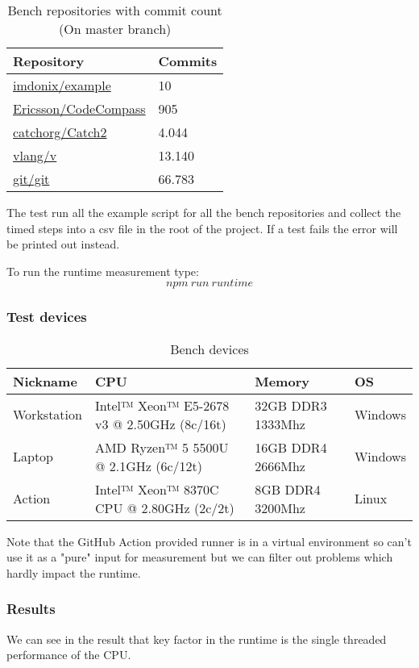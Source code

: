 \begin{table}[H]
	\centering
	\begin{tabular}{ | m{} | m{} | }
		\hline
		\textbf{Repository} & \textbf{Commits} \\
		\hline \hline
		\href{https://github.com/imdonix/example}{imdonix/example} & 10 \\
		\hline
		\href{https://github.com/Ericsson/CodeCompass}{Ericsson/CodeCompass} & 905 \\
		\hline
		\href{https://github.com/catchorg/Catch2}{catchorg/Catch2} & 4.044 \\
		\hline
		\href{https://github.com/vlang/v}{vlang/v} & 13.140 \\
		\hline
		\href{https://github.com/git/git}{git/git} & 66.783 \\
		\hline
	\end{tabular}
	\caption{Bench repositories with commit count (On master branch)}
	\label{tab:runtime}
\end{table}

The test run all the example script for all the bench repositories and collect the timed steps into a csv file in the root of the project. If a test fails the error will be printed out instead.

To run the runtime measurement type:
\[npm\ run\ runtime\]

\subsubsection{Test devices}

\begin{table}[H]
	\centering
	\begin{tabular}{ | m{} | m{} | m{} |  m{} | }
		\hline
		\textbf{Nickname} & \textbf{CPU} & \textbf{Memory} & \textbf{OS}  \\
		\hline \hline
		Workstation & Intel™ Xeon™ E5-2678 v3 @ 2.50GHz (8c/16t) & 32GB DDR3 1333Mhz  & Windows \\ 
		\hline
		Laptop & AMD Ryzen™ 5 5500U @ 2.1GHz (6c/12t) & 16GB DDR4 2666Mhz & Windows \\
		\hline
		Action & Intel™ Xeon™ 8370C CPU @ 2.80GHz (2c/2t) & 8GB DDR4 3200Mhz & Linux \\
		\hline
	\end{tabular}
	\caption{Bench devices}
	\label{tab:devices}
\end{table}

Note that the GitHub Action provided runner is in a virtual environment so can't use it as a "pure" input for measurement but we can filter out problems which hardly impact the runtime.   

\subsubsection{Results}



We can see in the result that key factor in the runtime is the single threaded performance of the CPU. 